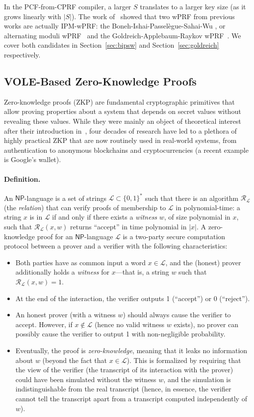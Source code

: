 \documentclass[journal=tosc,submission]{iacrtrans}
\theoremstyle{theorem}
\newcommand\bit{\ensuremath{\{0,1\}}\xspace}
\newcommand\NP{\ensuremath{\mathsf{NP}}\xspace}
\newcommand\Lang{\ensuremath{\mathcal{L}}\xspace}
\newcommand\Rel{\ensuremath{\mathcal{R}}\xspace}
\begin{document}
In the PCF-from-CPRF compiler, a larger $S$ translates to a larger key size (as it grows linearly with $|S|$). The work of~\cite{EC:BCMPR24} showed that two wPRF from previous works are actually IPM-wPRF: the Boneh-Ishai-Passelègue-Sahai-Wu , or alternating moduli wPRF~\cite{TCC:BIPSW18} and the Goldreich-Applebaum-Raykov wPRF~\cite{DBLP:journals/eccc/ECCC-TR00-090,TCC:AppRay16b}. We cover both candidates in Section~\ref{sec:bipsw} and Section~\ref{sec:goldreich} respectively.

\subsection{VOLE-Based Zero-Knowledge Proofs}

Zero-knowledge proofs (ZKP) are fundamental cryptographic primitives that allow proving properties about a system that depends on secret values without revealing these values. While they were mainly an object of theoretical interest after their introduction in~\cite{GolMicRac89}, four decades of research have led to a plethora of highly practical ZKP that are now routinely used in real-world systems, from authentication to anonymous blockchains and cryptocurrencies (a recent example is Google's wallet).

\paragraph{Definition.} An $\NP$-language is a set of strings $\Lang\subset \bit^*$ such that there is an algorithm $\Rel_\Lang$ (the \emph{relation}) that can verify proofs of membership to $\Lang$ in polynomial-time: a string $x$ is in $\Lang$ if and only if there exists a \emph{witness} $w$, of size polynomial in $x$, such that $\Rel_\Lang(x,w)$ returns ``accept'' in time polynomial in $|x|$. A zero-knowledge proof for an $\NP$-language $\Lang$ is a two-party secure computation protocol between a prover and a verifier with the following characteristics:
\begin{itemize}
	\item Both parties have as common input a word $x \in \Lang$, and the (honest) prover additionally holds a \emph{witness} for $x$---that is, a string $w$ such that $\Rel_\Lang(x,w)=1$.
	\item At the end of the interaction, the verifier outputs 1 (``accept'') or 0 (``reject'').
	\item An honest prover (with a witness $w$) should always cause the verifier to accept. However, if $x\notin\Lang$ (hence no valid witness $w$ exists), no prover can possibly cause the verifier to output 1 with non-negligible probability.
	\item Eventually, the proof is \emph{zero-knowledge}, meaning that it leaks no information about $w$ (beyond the fact that $x\in \Lang$). This is formalized by requiring that the view of the verifier (the transcript of its interaction with the prover) could have been simulated without the witness $w$, and the simulation is indistinguishable from the real transcript (hence, in essence, the verifier cannot tell the transcript apart from a transcript computed independently of $w$).
\end{itemize}
\end{document}
